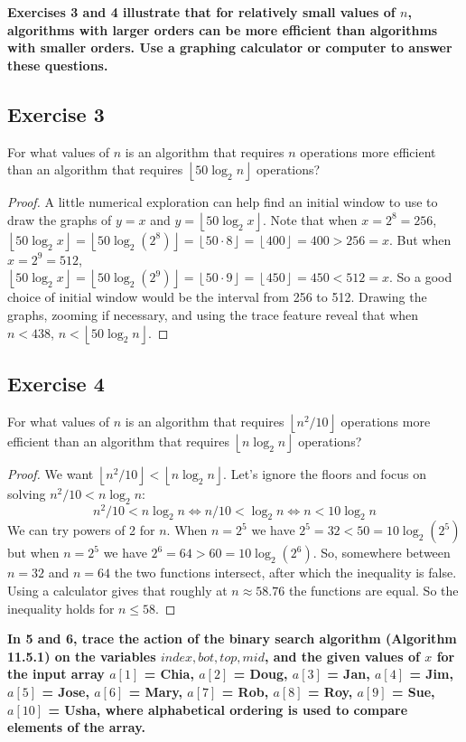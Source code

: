 \documentclass[14pt]{extarticle}
\newcommand{\cy}{\color{cyan}}
\newcommand{\floor}[1]{{\left\lfloor#1\right\rfloor}}
\begin{document}
{\bf \cy Exercises 3 and 4 illustrate that for relatively small values of \(n\), algorithms with larger orders can be 
more efficient than algorithms with smaller orders. Use a graphing calculator or computer to answer these questions.}

\subsection{Exercise 3}
For what values of \(n\) is an algorithm that requires \(n\) operations more efficient than an algorithm that requires 
\(\floor{50 \log_2 n}\) operations?

\begin{proof}
A little numerical exploration can help find an initial window to use to draw the graphs of \(y = x\) and \(y = \floor{50 
\log_2 x}\). Note that when \(x = 2^8 = 256\), \(\floor{50 \log_2 x} = \floor{50 \log_2(2^8)} = \floor{50 \cdot 8} = 
\floor{400} = 400 > 256 = x\). But when \(x = 2^9 = 512\), \(\floor{50 \log_2 x} = \floor{50 \log_2(2^9)} = \floor{50 
\cdot 9} = \floor{450} = 450 < 512 = x\). So a good choice of initial window would be the interval from 256 to 512. Drawing 
the graphs, zooming if necessary, and using the trace feature reveal that when \(n < 438\), \(n < \floor{50 \log_2 n}\).
\end{proof}

\subsection{Exercise 4}
For what values of \(n\) is an algorithm that requires \(\floor{n^2/10}\) operations more efficient than an algorithm 
that requires \(\floor{n \log_2 n}\) operations? 

\begin{proof}
We want \(\floor{n^2/10} < \floor{n \log_2 n}\). Let's ignore the floors and focus on solving \(n^2/10 < n \log_2 n\):
\[
n^2/10 < n \log_2 n \iff n/10 < \log_2 n \iff n < 10\log_2 n
\]
We can try powers of 2 for \(n\). When \(n = 2^5\) we have \(2^5 = 32 < 50 = 10\log_2(2^5)\) but when \(n = 2^5\) we have 
\(2^6 = 64 > 60 = 10\log_2(2^6)\). So, somewhere between \(n = 32\) and \(n = 64\) the two functions intersect, after which
the inequality is false. Using a calculator gives that roughly at \(n \approx 58.76\) the functions are equal. So the 
inequality holds for \(n \leq 58\).
\end{proof}

{\bf \cy In 5 and 6, trace the action of the binary search algorithm (Algorithm 11.5.1) on the variables \(index, bot, 
top, mid\), and the given values of \(x\) for the input array \(a[1]\) = Chia, \(a[2]\) = Doug, \(a[3]\) = Jan, \(a[4]\) = 
Jim, \(a[5]\) = Jose, \(a[6]\) = Mary, \(a[7]\) = Rob, \(a[8]\) = Roy, \(a[9]\) = Sue, \(a[10]\) = Usha, where alphabetical 
ordering is used to compare elements of the array.}
\end{document}
